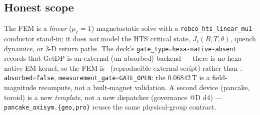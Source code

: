 \subsection{Honest scope}
\label{app:getdp-honest}

The FEM is a \emph{linear} ($\mu_r\!=\!1$) magnetostatic solve with a
\texttt{rebco\_hts\_linear\_mu1} conductor stand-in; it does \emph{not}
model the HTS critical state, $J_c(B,T,\theta)$, quench dynamics, or 3-D
return paths. The deck's \texttt{gate\_type=hexa-native-absent} records
that GetDP is an external (un-absorbed) backend --- there is no
hexa-native EM kernel, so the FEM is \tierGreen\ (reproducible external
script) rather than \tierBlue. \texttt{absorbed=false},
\texttt{measurement\_gate=GATE\_OPEN}: the $0.06842$\,T is a field-magnitude
recompute, not a built-magnet validation. A second device (pancake,
toroid) is a new \emph{template}, not a new dispatcher (governance @D d4) ---
\texttt{pancake\_axisym.\{geo,pro\}} reuses the same physical-group
contract.
